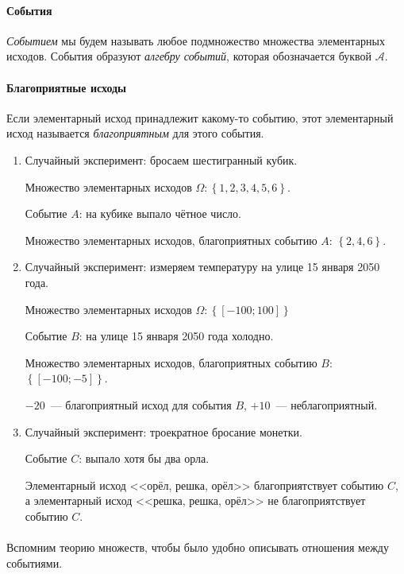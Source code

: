 \documentclass[11pt]{article}
\begin{document}
\paragraph{События} \emph{Событием} мы будем называть любое подмножество множества элементарных исходов. События образуют \emph{алгебру событий}, которая обозначается буквой $\mathcal{A}$.

\paragraph{Благоприятные исходы} Если элементарный исход принадлежит какому-то событию, этот элементарный исход называется \emph{благоприятным} для этого события.

\begin{examples}
\item[]
\begin{enumerate}
	\item Случайный эксперимент: бросаем шестигранный кубик.
	
	Множество элементарных исходов $\Omega: \left\{1,2,3,4,5,6\right\}$.
	
	Событие $A$: на кубике выпало чётное число.
	
	Множество элементарных исходов, благоприятных событию $A$: $\left\{2,4,6\right\}$.
	
	\item Случайный эксперимент: измеряем температуру на улице 15 января 2050 года.
	
	Множество элементарных исходов $\Omega: \left\{\left[-100;100\right]\right\}$
	
	Событие $B$: на улице 15 января 2050 года холодно.
	
	Множество элементарных исходов, благоприятных событию $B$: $\left\{\left[-100;-5\right]\right\}$.
	
	$-20$~--- благоприятный исход для события $B$, $+10$~--- неблагоприятный.
	
	\item Случайный эксперимент: троекратное бросание монетки.
	
	Событие $C$: выпало хотя бы два орла. 
	
	Элементарный исход <<орёл, решка, орёл>> благоприятствует событию $C$, а элементарный исход <<решка, решка, орёл>> не благоприятствует событию $C$.
\end{enumerate}
\end{examples}

\paragraph{}Вспомним теорию множеств, чтобы было удобно описывать отношения между событиями.
\end{document}
